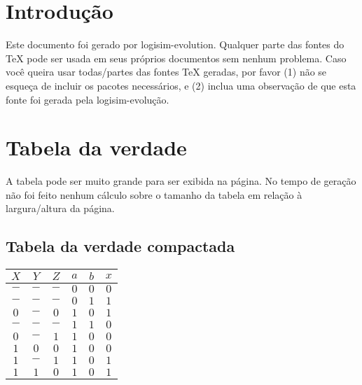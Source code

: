 \documentclass [15pt,a4paper,twoside]{article}
\begin{document}
\section{Introdução}
Este documento foi gerado por logisim-evolution. Qualquer parte das fontes do TeX pode ser usada em seus próprios documentos sem nenhum problema. Caso você queira usar todas/partes das fontes TeX geradas, por favor (1) não se esqueça de incluir os pacotes necessários, e (2) inclua uma observação de que esta fonte foi gerada pela logisim-evolução.
\section{Tabela da verdade}
A tabela pode ser muito grande para ser exibida na página. No tempo de geração não foi feito nenhum cálculo sobre o tamanho da tabela em relação à largura/altura da página.
\subsection{Tabela da verdade compactada}
\begin{center}
\begin{tabular}{ccccc|c}
$X$&$Y$&$Z$&$a$&$b$&$x$\\
\hline
$-$&$-$&$-$&$0$&$0$&$0$\\
$-$&$-$&$-$&$0$&$1$&$1$\\
$0$&$-$&$0$&$1$&$0$&$1$\\
$-$&$-$&$-$&$1$&$1$&$0$\\
$0$&$-$&$1$&$1$&$0$&$0$\\
$1$&$0$&$0$&$1$&$0$&$0$\\
$1$&$-$&$1$&$1$&$0$&$1$\\
$1$&$1$&$0$&$1$&$0$&$1$\\

\end{tabular}
\end{center}
\end{document}
